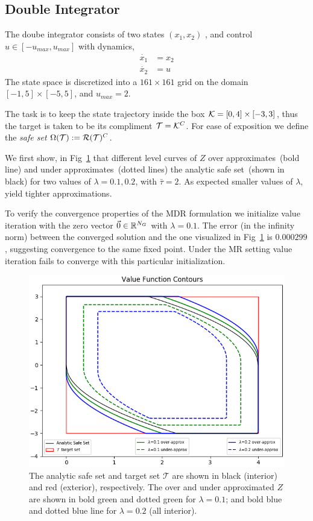 \subsection{Double Integrator}
The doube integrator consists of two states $(x_1, x_2)$ , and  control $u \in [-u_{max}, u_{max}]$ with dynamics,
\begin{equation}
\begin{split}
\dot{x_1} & = x_2 \\
\dot{x_2} & = u 
\end{split}
\end{equation}
\noindent The state space is discretized into a $161 \times 161$ grid on the domain $[-1,5] \times [-5,5]$, and $u_{max}=2$.

The task is to keep the state trajectory inside the box $\mathcal{K} = [0,4] \times [-3,3]$, thus the target is taken to be its compliment $\mathcal{T}=\mathcal{K}^C$. For ease of exposition we define the \emph{safe set} $\Omega(\mathcal{T}) := \mathcal{R}(\mathcal{T})^C$.

We first show, in Fig~\ref{fig:convergence} that different level curves of $Z$ over approximates~(bold line) and under approximates~(dotted lines) the analytic safe set~(shown in black) for two values of $\lambda = 0.1, 0.2$, with $\bar{\tau}=2$. As expected smaller values of $\lambda$, yield tighter approximations. 

To verify the convergence properties of the MDR formulation we initialize value iteration with the zero vector $\vec{0}\in \mathbb{R}^{N_G}$ with $\lambda=0.1$. The error (in the infinity norm) between the converged solution and the one visualized in Fig~\ref{fig:convergence} is $0.000299$, suggesting convergence to the same fixed point. Under the MR setting value iteration fails to converge with this particular initialization.

\begin{figure}
\includegraphics[scale=0.5]{convergence_difflambda.png}
\caption{The analytic safe set and target set $\mathcal{T}$ are shown in black (interior) and red (exterior), respectively. The over and under approximated $Z$ are shown in bold green and dotted green for $\lambda=0.1$; and bold blue and dotted blue line for $\lambda  = 0.2$ (all interior).}
\label{fig:convergence}
\end{figure}

